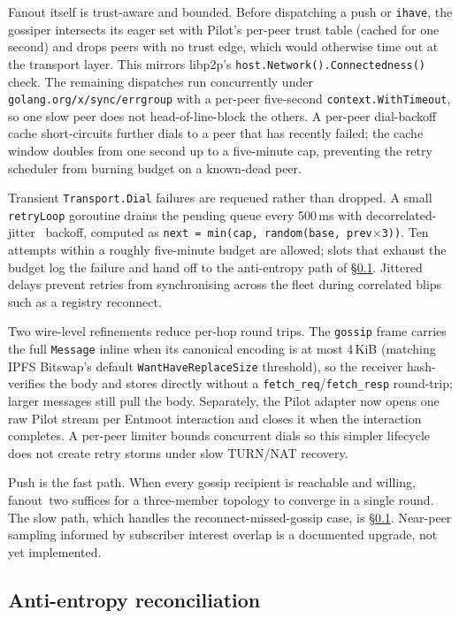 \documentclass[11pt,a4paper,twocolumn]{article}
\begin{document}
Fanout itself is trust-aware and bounded. Before dispatching a
push or \texttt{ihave}, the gossiper intersects its eager set
with Pilot's per-peer trust table (cached for one second) and
drops peers with no trust edge, which would otherwise time out
at the transport layer. This mirrors libp2p's
\texttt{host.Network().Connectedness()} check. The remaining
dispatches run concurrently under
\texttt{golang.org/x/sync/errgroup} with a per-peer five-second
\texttt{context.WithTimeout}, so one slow peer does not
head-of-line-block the others. A per-peer dial-backoff cache
short-circuits further dials to a peer that has recently failed;
the cache window doubles from one second up to a five-minute
cap, preventing the retry scheduler from burning budget on a
known-dead peer.

Transient \texttt{Transport.Dial} failures are requeued rather
than dropped. A small \texttt{retryLoop} goroutine drains the
pending queue every 500\,ms with
decorrelated-jitter~\citep{brooker2015jitter} backoff, computed
as \texttt{next = min(cap, random(base, prev$\times$3))}. Ten
attempts within a roughly five-minute budget are allowed; slots
that exhaust the budget log the failure and hand off to the
anti-entropy path of \S\ref{sec:antientropy}. Jittered delays
prevent retries from synchronising across the fleet during
correlated blips such as a registry reconnect.

Two wire-level refinements reduce per-hop round trips. The
\texttt{gossip} frame carries the full \texttt{Message} inline
when its canonical encoding is at most 4\,KiB (matching IPFS
Bitswap's default \texttt{WantHaveReplaceSize} threshold), so
the receiver hash-verifies the body and stores directly without
a \texttt{fetch\_req}/\texttt{fetch\_resp} round-trip; larger
messages still pull the body. Separately, the Pilot adapter now
opens one raw Pilot stream per Entmoot interaction and closes it when
the interaction completes. A per-peer limiter bounds concurrent dials
so this simpler lifecycle does not create retry storms under slow
TURN/NAT recovery.

Push is the fast path. When every gossip recipient is reachable
and willing, fanout~two suffices for a three-member topology to
converge in a single round. The slow path, which handles the
reconnect-missed-gossip case, is \S\ref{sec:antientropy}.
Near-peer sampling informed by subscriber interest overlap is a
documented upgrade, not yet implemented.

\subsection{Anti-entropy reconciliation}
\label{sec:antientropy}
\end{document}
